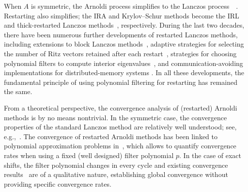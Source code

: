 \documentclass{siamart190516}
\begin{document}
When $A$ is symmetric, the Arnoldi process simplifies to the Lanczos process~~\cite[Sec. 10.5]{Golub2013}. Restarting also simplifies; the IRA and Krylov--Schur methods become the IRL~\cite{calvetti1994implicitly} and thick-restarted Lanczos methods~\cite{wu2000thick}, respectively. During the last two decades, there
have been numerous further developments of restarted Lanczos methods, including extensions to block Lanczos methods~\cite{zhou2008block, baglama2003irbl}, adaptive strategies for selecting the number of Ritz vectors retained after each
restart~\cite{yamazaki2010adaptive}, strategies for choosing polynomial filters to compute interior eigenvalues~\cite{li2016thick, baglama1996iterative}, and communication-avoiding implementations for distributed-memory systems \cite{yamazaki2012communication}. In all these developments, the fundamental principle of using polynomial filtering for restarting has remained the same. 

From a theoretical perspective, the convergence analysis of (restarted) Arnoldi methods is by no means nontrivial. In the symmetric case, the convergence properties of the standard Lanczos method are relatively well understood; see, e.g.,~\cite{Kaniel1966,Saad1980, Meyer2024}. The convergence of restarted Arnoldi methods has been linked to polynomial approximation problems in~\cite{Beattie2005}, which allows to quantify convergence rates when using a fixed (well designed) filter polynomial $p$. In the case of exact shifts, the filter polynomial changes in every cycle and existing convergence results~\cite{aishima2015global,sorensen1992implicit} are of a qualitative nature, establishing global convergence without providing specific convergence rates.
\end{document}
